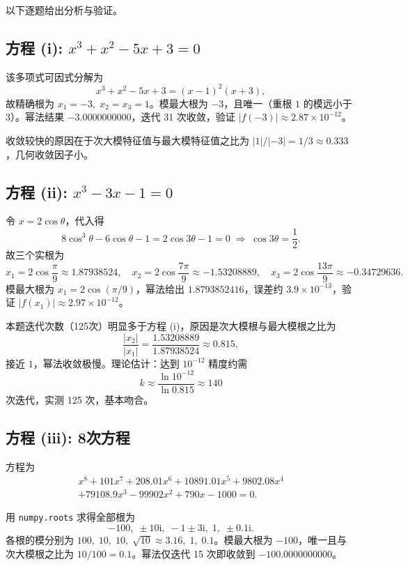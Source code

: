 \documentclass[10pt, a4paper]{article}
\begin{document}
以下逐题给出分析与验证。

\subsection{方程 (i): $x^3 + x^2 - 5x + 3 = 0$}

该多项式可因式分解为
\[
x^3 + x^2 - 5x + 3 = (x-1)^2(x+3),
\]
故精确根为 $x_1 = -3,\; x_2 = x_3 = 1$。模最大根为 $-3$，且唯一（重根 $1$ 的模远小于 $3$）。幂法结果 $-3.0000000000$，迭代 31 次收敛，验证 $|f(-3)| \approx 2.87\times10^{-12}$。

收敛较快的原因在于次大模特征值与最大模特征值之比为 $|1|/|-3| = 1/3 \approx 0.333$，几何收敛因子小。

\subsection{方程 (ii): $x^3 - 3x - 1 = 0$}

令 $x = 2\cos\theta$，代入得
\[
8\cos^3\theta - 6\cos\theta - 1 = 2\cos 3\theta - 1 = 0
\;\Longrightarrow\; \cos 3\theta = \frac{1}{2}.
\]
故三个实根为
\[
x_1 = 2\cos\frac{\pi}{9} \approx 1.87938524, \quad
x_2 = 2\cos\frac{7\pi}{9} \approx -1.53208889, \quad
x_3 = 2\cos\frac{13\pi}{9} \approx -0.34729636.
\]
模最大根为 $x_1 = 2\cos(\pi/9)$，幂法给出 $1.8793852416$，误差约 $3.9\times10^{-13}$，验证 $|f(x_1)| \approx 2.97\times10^{-12}$。

本题迭代次数（125次）明显多于方程 (i)，原因是次大模根与最大模根之比为
\[
\frac{|x_2|}{|x_1|} = \frac{1.53208889}{1.87938524} \approx 0.815,
\]
接近 $1$，幂法收敛极慢。理论估计：达到 $10^{-12}$ 精度约需
\[
k \approx \frac{\ln 10^{-12}}{\ln 0.815} \approx 140
\]
次迭代，实测 125 次，基本吻合。

\subsection{方程 (iii): 8次方程}

方程为
\begin{multline*}
x^8 + 101x^7 + 208.01x^6 + 10891.01x^5 + 9802.08x^4 \\
+ 79108.9x^3 - 99902x^2 + 790x - 1000 = 0.
\end{multline*}

用 \texttt{numpy.roots} 求得全部根为
\[
-100,\; \pm 10\mathrm{i},\; -1\pm 3\mathrm{i},\; 1,\; \pm 0.1\mathrm{i}.
\]
各根的模分别为 $100,\; 10,\; 10,\; \sqrt{10}\approx 3.16,\; 1,\; 0.1$。模最大根为 $-100$，唯一且与次大模根之比为 $10/100 = 0.1$。幂法仅迭代 15 次即收敛到 $-100.0000000000$。
\end{document}

